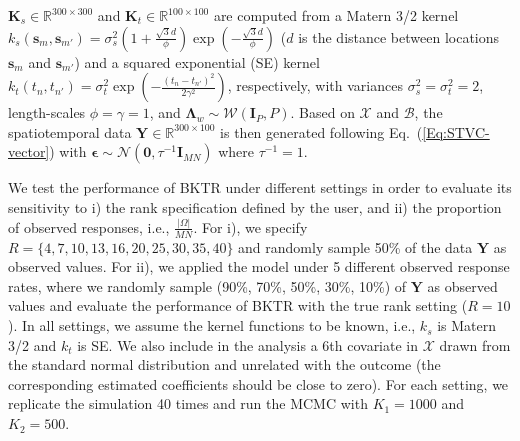 \documentclass[12pt]{article}
\newcommand{\bd}[1]{\boldsymbol{#1}}
\begin{document}
$\boldsymbol{K}_{s}\in\mathbb{R}^{300\times300}$ and $\boldsymbol{K}_{t}\in\mathbb{R}^{100\times100}$ are computed from a Matern 3/2 kernel $k_s(\bd{s}_{m},\bd{s}_{m'})=\sigma_{s}^2\left(1+\frac{\sqrt{3}d}{\phi}\right)\exp{\left(-\frac{\sqrt{3}d}{\phi}\right)}$ ($d$ is the distance between locations $\bd{s}_{m}$ and $\bd{s}_{m'}$) and a squared exponential (SE) kernel $k_t(t_{n},t_{n'})=\sigma_{t}^2\exp{\left(-\frac{(t_{n}-t_{n'})^2}{2\gamma^{2}}\right)}$, respectively, with variances $\sigma_s^2=\sigma_t^2=2$, length-scales $\phi=\gamma=1$, and $\boldsymbol{\Lambda}_{w}\sim\mathcal{W}(\boldsymbol{I}_{P},P)$. Based on $\boldsymbol{\mathcal{X}}$ and $\boldsymbol{\mathcal{B}}$, the spatiotemporal data $\boldsymbol{Y}\in\mathbb{R}^{300\times100}$ is then generated following Eq.~(\ref{Eq:STVC-vector}) with $\boldsymbol{\epsilon}\sim\mathcal{N}(\boldsymbol{0},\tau^{-1}\boldsymbol{I}_{MN})$ where $\tau^{-1}=1$.


We test the performance of BKTR under different settings in order to evaluate its sensitivity to i) the rank specification defined by the user, and ii) the proportion of observed responses, i.e., $\frac{|\Omega|}{MN}$. For i), we specify ${R=\{4,7,10,13,16,20,25,30,35,40\}}$ and randomly sample 50\% of the data $\boldsymbol{Y}$ as observed values. For ii), we applied the model under 5 different observed response rates, where we randomly sample (90\%, 70\%, 50\%, 30\%, 10\%) of $\boldsymbol{Y}$ as observed values and evaluate the performance of BKTR with the true rank setting ($R=10$). In all settings, we assume the kernel functions to be known, i.e., $k_s$ is Matern 3/2 and $k_t$ is SE. We also include in the analysis a 6th covariate in $\boldsymbol{\mathcal{X}}$ drawn from the standard normal distribution and unrelated with the outcome (the corresponding estimated coefficients should be close to zero). %
For each setting, we replicate the simulation 40 times and run the MCMC with $K_1=1000$ and $K_2=500$.
\end{document}
